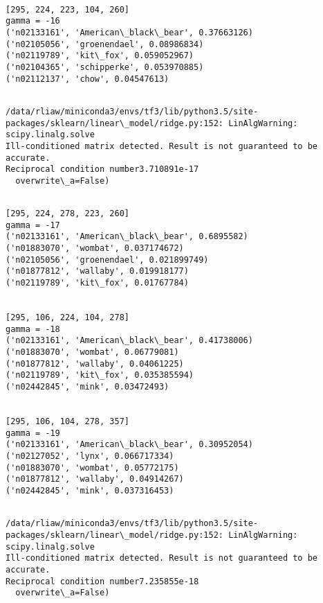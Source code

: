 \documentclass[11pt]{article}
\begin{document}
    \begin{Verbatim}[commandchars=\\\{\}]

[295, 224, 223, 104, 260]
gamma = -16
('n02133161', 'American\_black\_bear', 0.37663126)
('n02105056', 'groenendael', 0.08986834)
('n02119789', 'kit\_fox', 0.059052967)
('n02104365', 'schipperke', 0.053970885)
('n02112137', 'chow', 0.04547613)


    \end{Verbatim}

    \begin{Verbatim}[commandchars=\\\{\}]
/data/rliaw/miniconda3/envs/tf3/lib/python3.5/site-packages/sklearn/linear\_model/ridge.py:152: LinAlgWarning: scipy.linalg.solve
Ill-conditioned matrix detected. Result is not guaranteed to be accurate.
Reciprocal condition number3.710891e-17
  overwrite\_a=False)

    \end{Verbatim}

    \begin{Verbatim}[commandchars=\\\{\}]

[295, 224, 278, 223, 260]
gamma = -17
('n02133161', 'American\_black\_bear', 0.6895582)
('n01883070', 'wombat', 0.037174672)
('n02105056', 'groenendael', 0.021899749)
('n01877812', 'wallaby', 0.019918177)
('n02119789', 'kit\_fox', 0.01767784)


[295, 106, 224, 104, 278]
gamma = -18
('n02133161', 'American\_black\_bear', 0.41738006)
('n01883070', 'wombat', 0.06779081)
('n01877812', 'wallaby', 0.04061225)
('n02119789', 'kit\_fox', 0.035385594)
('n02442845', 'mink', 0.03472493)


[295, 106, 104, 278, 357]
gamma = -19
('n02133161', 'American\_black\_bear', 0.30952054)
('n02127052', 'lynx', 0.066717334)
('n01883070', 'wombat', 0.05772175)
('n01877812', 'wallaby', 0.04914267)
('n02442845', 'mink', 0.037316453)


    \end{Verbatim}

    \begin{Verbatim}[commandchars=\\\{\}]
/data/rliaw/miniconda3/envs/tf3/lib/python3.5/site-packages/sklearn/linear\_model/ridge.py:152: LinAlgWarning: scipy.linalg.solve
Ill-conditioned matrix detected. Result is not guaranteed to be accurate.
Reciprocal condition number7.235855e-18
  overwrite\_a=False)

    \end{Verbatim}
\end{document}

